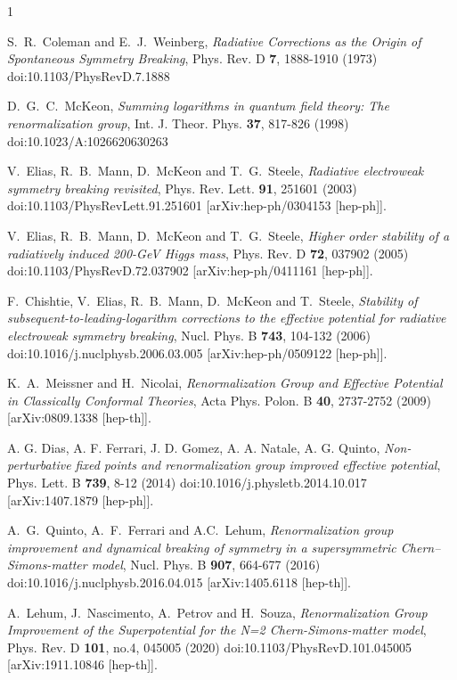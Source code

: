 \documentclass[11pt,a4paper,english,superscriptaddress,preprint,aps,prd]{revtex4}
\begin{document}
\begin{thebibliography}{1}

S.~R.~Coleman and E.~J.~Weinberg,
\textit{Radiative Corrections as the Origin of Spontaneous Symmetry Breaking},
Phys. Rev. D \textbf{7}, 1888-1910 (1973)
doi:10.1103/PhysRevD.7.1888

{D.~G.~C.~McKeon,
\textit{Summing logarithms in quantum field theory: The renormalization group},
Int. J. Theor. Phys. \textbf{37}, 817-826 (1998)
doi:10.1023/A:1026620630263}

V.~Elias, R.~B.~Mann, D.~McKeon and T.~G.~Steele,
\textit{Radiative electroweak symmetry breaking revisited},
Phys. Rev. Lett. \textbf{91}, 251601 (2003)
doi:10.1103/PhysRevLett.91.251601
[arXiv:hep-ph/0304153 [hep-ph]].

V.~Elias, R.~B.~Mann, D.~McKeon and T.~G.~Steele,
\textit{Higher order stability of a radiatively induced 200-GeV Higgs mass},
Phys. Rev. D \textbf{72}, 037902 (2005)
doi:10.1103/PhysRevD.72.037902
[arXiv:hep-ph/0411161 [hep-ph]].

F.~Chishtie, V.~Elias, R.~B.~Mann, D.~McKeon and T.~Steele,
\textit{Stability of subsequent-to-leading-logarithm corrections to the effective potential for radiative electroweak symmetry breaking},
Nucl. Phys. B \textbf{743}, 104-132 (2006)
doi:10.1016/j.nuclphysb.2006.03.005
[arXiv:hep-ph/0509122 [hep-ph]].

K.~A.~Meissner and H.~Nicolai,
\textit{Renormalization Group and Effective Potential in Classically Conformal Theories},
Acta Phys. Polon. B \textbf{40}, 2737-2752 (2009)
[arXiv:0809.1338 [hep-th]].

A. G. Dias, A. F. Ferrari, J. D. Gomez, A. A. Natale, A. G. Quinto,
\textit{Non-perturbative fixed points and renormalization group improved effective potential},
Phys. Lett. B \textbf{739}, 8-12 (2014)
doi:10.1016/j.physletb.2014.10.017
[arXiv:1407.1879 [hep-ph]].

A.~G.~Quinto, A.~F.~Ferrari and A.C.~Lehum,
\textit{Renormalization group improvement and dynamical breaking of symmetry in a supersymmetric Chern–Simons-matter model},
Nucl. Phys. B \textbf{907}, 664-677 (2016)
doi:10.1016/j.nuclphysb.2016.04.015
[arXiv:1405.6118 [hep-th]].

A.~Lehum, J.~Nascimento, A.~Petrov and H.~Souza,
\textit{Renormalization Group Improvement of the Superpotential for the N=2 Chern-Simons-matter model},
Phys. Rev. D \textbf{101}, no.4, 045005 (2020)
doi:10.1103/PhysRevD.101.045005
[arXiv:1911.10846 [hep-th]].


\end{thebibliography}
\end{document}
